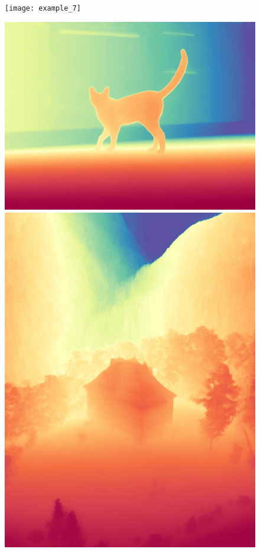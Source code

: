 \documentclass[12pt, letterpaper]{article}
\begin{document}
\begin{figure}[!ht]
\begin{minipage}{0.22\textwidth}
        \texttt{[image: example\_7]}
    \end{minipage}
    \begin{minipage}{0.22\textwidth}
        \includegraphics[width=\textwidth]{example_1_pred_colored}
        \includegraphics[width=\textwidth]{example_3_pred_colored}

\end{minipage}
\end{figure}
\end{document}
